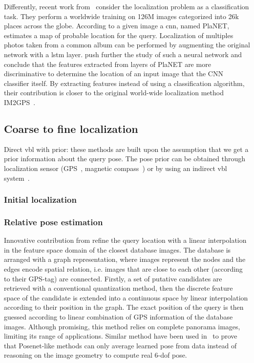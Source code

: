 Differently, recent work from~\citet{Weyand2016} consider the localization problem as a classification task. They perform a worldwide training on 126M images categorized into 26k places across the globe. According to a given image a \ac{cnn}, named PlaNET, estimates a map of probable location for the query. Localization of multiples photos taken from a common album can be performed by augmenting the original network with a \ac{lstm} layer. \citet{Vo2017} push further the study of such a neural network and conclude that the features extracted from layers of PlaNET are more discriminative to determine the location of an input image that the CNN classifier itself. By extracting features instead of using a classification algorithm, their contribution is closer to the original world-wide localization method IM2GPS~\citep{Hays2008}.


\subsection{Coarse to fine localization}

Direct \ac{vbl} with prior: these methods are built upon the assumption that we get a prior information about the query pose. The pose prior can be obtained through localization sensor (GPS~\citep{Chen2011,Arth2015,Poglitsch2015}, magnetic compass~\citep{Svarm2014,Zeisl2015,Svarm2016}) or by using an indirect \ac{vbl} system~\citep{Torii2011,Song2016,Sattler2017}.

\subsubsection{Initial localization}

\subsubsection{Relative pose estimation}

Innovative contribution from \citet{Torii2011} refine the query location with a linear interpolation in the feature space domain of the closest database images. The database is arranged with a graph representation, where images represent the nodes and the edges encode spatial relation, i.e. images that are close to each other (according to their GPS-tag) are connected. Firstly, a set of putative candidates are retrieved with a conventional quantization method, then the discrete feature space of the candidate is extended into a continuous space by linear interpolation according to their position in the graph. The exact position of the query is then guessed according to linear combination of GPS information of the database images. Although promising, this method relies on complete panorama images, limiting its range of applications. Similar method have been used in~\citep{Sattler2019} to prove that Posenet-like methods can only average learned pose from data instead of reasoning on the image geometry to compute real 6-\ac{dof} pose.